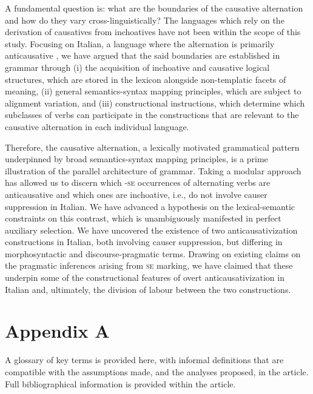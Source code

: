 \documentclass[output=paper,colorlinks,citecolor=brown
]{langscibook}
\begin{document}
A fundamental question is: what are the boundaries of the causative alternation and how do they vary cross-linguistically? The languages which rely on the derivation of causatives from inchoatives have not been within the scope of this study. Focusing on Italian, a language where the alternation is primarily anticausative \citep{haspelmath1993more}, we have argued that the said boundaries are established in grammar through (i) the acquisition of inchoative and causative logical structures, which are stored in the lexicon alongside non-templatic facets of meaning, (ii) general semantics-syntax mapping principles, which are subject to alignment variation, and (iii) constructional instructions, which determine which subclasses of verbs can participate in the constructions that are relevant to the causative alternation in each individual language.  

 Therefore, the causative alternation, a lexically motivated grammatical pattern underpinned by broad semantics-syntax mapping principles, is a prime illustration of the parallel architecture of grammar. Taking a modular approach has allowed us to discern which -\textsc{se} occurrences of alternating verbs are anticausative and which ones are inchoative, i.e., do not involve causer suppression in Italian. We have advanced a hypothesis on the lexical-semantic constraints on this contrast, which is unambiguously manifested in perfect auxiliary selection. We have uncovered the existence of two anticausativization constructions in Italian, both involving causer suppression, but differing in morphosyntactic and discourse-pragmatic terms. Drawing on existing claims on the pragmatic inferences arising from \textsc{se} marking, we have claimed that these underpin some of the constructional features of overt anticausativization in Italian and, ultimately, the division of labour between the two constructions. 

\section*{Appendix A}

A glossary of key terms is provided here, with informal definitions that are compatible with the assumptions made, and the analyses proposed, in the article. Full bibliographical information is provided within the article. 
\end{document}
